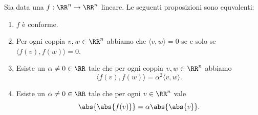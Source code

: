 \documentclass[11pt]{scrartcl}
\begin{document}
   	 \begin{proposition}
   	 	Sia data una $f:\RR^n\to\RR^n$ lineare. Le seguenti proposizioni sono equvalenti:
   	 	\begin{enumerate}
   	 		\item $f$ è conforme.
   	 		\item Per ogni coppia $v,w\in \RR^n$ abbiamo che $\langle v,w\rangle=0$ se e solo se $\langle f(v),f(w)\rangle=0$.
   	 		\item Esiste un $\alpha\ne 0\in \RR$ tale che per ogni coppia $v,w\in \RR^n$ abbiamo
   	 		$$\langle f(v),f(w)\rangle = \alpha^2 \langle v,w \rangle.$$
   	 		\item Esiste un $\alpha\ne 0\in \RR$ tale che per ogni $v\in \RR^n$ vale
   	 		$$\abs{\abs{f(v)}}=\alpha \abs{\abs{v}}.$$
   	 	\end{enumerate}
   	 \end{proposition}
\end{document}
